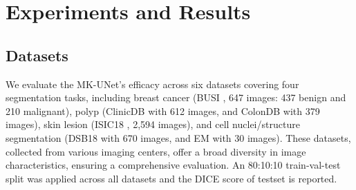 \section{Experiments and Results}
\label{sec:experiments}
\subsection{Datasets}
\label{assec:Datasets}
We evaluate the MK-UNet's efficacy across six datasets covering four segmentation tasks, including breast cancer (BUSI \cite{al2020dataset}, 647 images: 437 benign and 210 malignant), polyp (ClinicDB \cite{bernal2015wm} with 612 images, and ColonDB \cite{vazquez2017benchmark} with 379 images), skin lesion (ISIC18 \cite{codella2019skin}, 2,594 images), and cell nuclei/structure segmentation (DSB18 \cite{caicedo2019nucleus} with 670 images, and EM \cite{cardona2010integrated} with 30 images). These datasets, collected from various imaging centers, offer a broad diversity in image characteristics, ensuring a comprehensive evaluation. An 80:10:10 train-val-test split was applied across all datasets and the DICE score of testset is reported.


